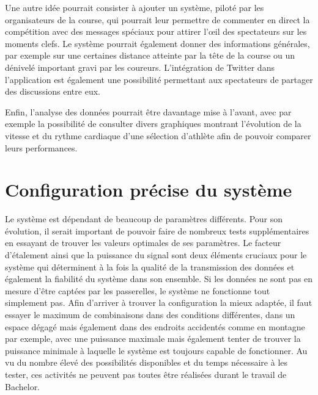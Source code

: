 Une autre idée pourrait consister à ajouter un système, piloté par les organisateurs de la course, qui pourrait leur permettre de commenter en direct la compétition avec des messages spéciaux pour attirer l'œil des spectateurs sur les moments clefs. Le système pourrait également donner des informations générales, par exemple sur une certaines distance atteinte par la tête de la course ou un dénivelé important gravi par les coureurs. L'intégration de Twitter dans l'application est également une possibilité permettant aux spectateurs de partager des discussions entre eux.

Enfin, l'analyse des données pourrait être davantage mise à l'avant, avec par exemple la possibilité de consulter divers graphiques montrant l'évolution de la vitesse et du rythme cardiaque d'une sélection d'athlète afin de pouvoir comparer leurs performances.

\section{Configuration précise du système}

Le système est dépendant de beaucoup de paramètres différents. Pour son évolution, il serait important de pouvoir faire de nombreux tests supplémentaires en essayant de trouver les valeurs optimales de ses paramètres. Le facteur d'étalement ainsi que la puissance du signal sont deux éléments cruciaux pour le système qui déterminent à la fois la qualité de la transmission des données et également la fiabilité du système dans son ensemble. Si les données ne sont pas en mesure d'être captées par les passerelles, le système ne fonctionne tout simplement pas. Afin d'arriver à trouver la configuration la mieux adaptée, il faut essayer le maximum de combinaisons dans des conditions différentes, dans un espace dégagé mais également dans des endroits accidentés comme en montagne par exemple, avec une puissance maximale mais également tenter de trouver la puissance minimale à laquelle le système est toujours capable de fonctionner. Au vu du nombre élevé des possibilités disponibles et du temps nécessaire à les tester, ces activités ne peuvent pas toutes être réalisées durant le travail de Bachelor.